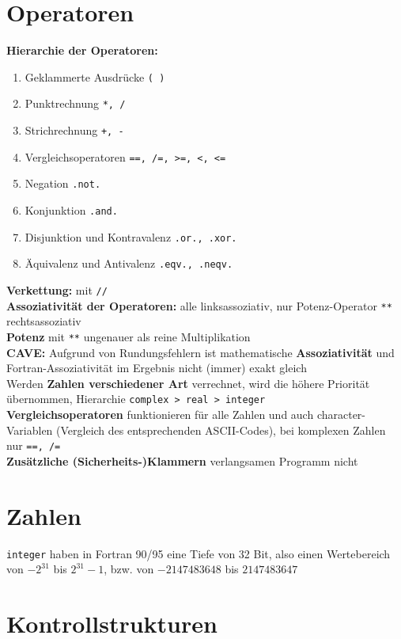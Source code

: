\documentclass[a4paper, twocolumn]{scrarticle}
\begin{document}
  \section{Operatoren}
  \textbf{Hierarchie der Operatoren:}
  \begin{enumerate}
    \item Geklammerte Ausdrücke \lstinline|( )|
    \item Punktrechnung \lstinline|*, /|
    \item Strichrechnung \lstinline|+, -|
    \item Vergleichsoperatoren \lstinline|==, /=, >=, <, <=|
    \item Negation \lstinline|.not.|
    \item Konjunktion \lstinline|.and.|
    \item Disjunktion und Kontravalenz \lstinline|.or., .xor.|
    \item Äquivalenz und Antivalenz \lstinline|.eqv., .neqv.|
  \end{enumerate}
  \textbf{Verkettung:} mit \lstinline|//|\\
  \textbf{Assoziativität der Operatoren:} alle linksassoziativ, nur Potenz-Operator \lstinline|**| rechtsassoziativ\\
  \textbf{Potenz} mit \lstinline|**| ungenauer als reine Multiplikation\\
  \textbf{CAVE:} Aufgrund von Rundungsfehlern ist mathematische \textbf{Assoziativität} und Fortran-Assoziativität im Ergebnis nicht (immer) exakt gleich \\
  Werden \textbf{Zahlen verschiedener Art} verrechnet, wird die höhere Priorität übernommen, Hierarchie \lstinline|complex > real > integer|\\
  \textbf{Vergleichsoperatoren} funktionieren für alle Zahlen und auch character-Variablen (Vergleich des entsprechenden ASCII-Codes), bei komplexen Zahlen nur \lstinline|==, /=|\\
  \textbf{Zusätzliche (Sicherheits-)Klammern} verlangsamen Programm nicht
  
  \section{Zahlen}
  \lstinline|integer| haben in Fortran 90/95 eine Tiefe von 32 Bit, also einen Wertebereich von $-2^{31}$ bis $2^{31}-1$, bzw. von $-2147483648$ bis $2147483647$
  
  \section{Kontrollstrukturen}
\end{document}
